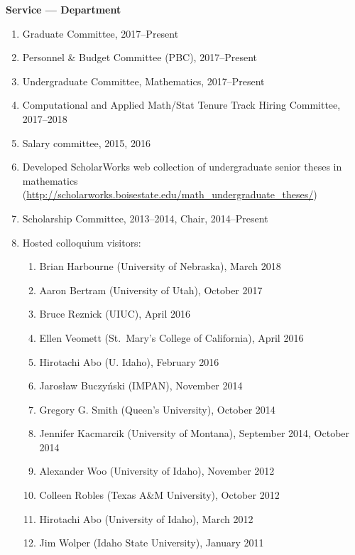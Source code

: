 \documentclass[12pt]{article}
\begin{document}
\textbf{Service --- Department}
\begin{enumerate}

\item Graduate Committee, 2017--Present

\item Personnel \& Budget Committee (PBC), 2017--Present

\item Undergraduate Committee, Mathematics, 2017--Present

\item Computational and Applied Math/Stat Tenure Track Hiring Committee, 2017--2018

\item Salary committee, 2015, 2016

\item Developed ScholarWorks web collection of undergraduate senior theses in mathematics
(\url{http://scholarworks.boisestate.edu/math_undergraduate_theses/})


\item Scholarship Committee, 2013--2014, Chair, 2014--Present

\item Hosted colloquium visitors:
\begin{enumerate}
\item Brian Harbourne (University of Nebraska), March 2018
\item Aaron Bertram (University of Utah), October 2017
\item Bruce Reznick (UIUC), April 2016
\item Ellen Veomett (St.\ Mary's College of California), April 2016
\item Hirotachi Abo (U. Idaho), February 2016
\item Jaros{\l}aw Buczy\'nski (IMPAN), November 2014
\item Gregory G. Smith (Queen's University), October 2014
\item Jennifer Kacmarcik (University of Montana), September 2014, October 2014 %
\item Alexander Woo (University of Idaho), November 2012
\item Colleen Robles (Texas A\&M University), October 2012
\item Hirotachi Abo (University of Idaho), March 2012
\item Jim Wolper (Idaho State University), January 2011
\end{enumerate}


\end{enumerate}
\end{document}
